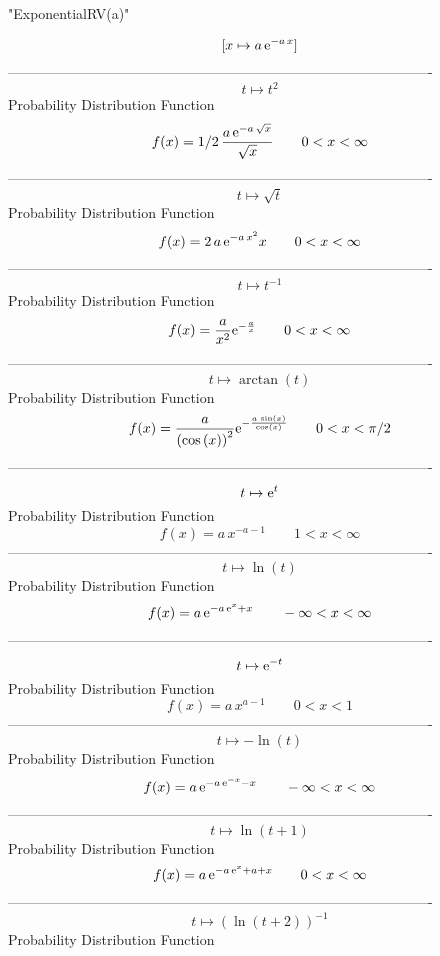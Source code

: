 \documentclass[12pt]{article}
\begin{document}
 
                             "ExponentialRV(a)"

$$[x\mapsto a\,{{\rm e}^{-a\,x}}]
$$-------------------------------------------------------------------------------------------  \\$$t\mapsto {t}^{2}
$$Probability Distribution Function 
$$  f(x)=1/2\,{\frac {a\,{{\rm e}^{-a\,\sqrt {x}}}}{\sqrt {x}}}
 \qquad0
 < x < \infty 
$$-------------------------------------------------------------------------------------------  \\$$t\mapsto \sqrt {t}
$$Probability Distribution Function 
$$  f(x)=2\,a\,{{\rm e}^{-a\,{x}^{2}}}x
 \qquad0
 < x < \infty 
$$-------------------------------------------------------------------------------------------  \\$$t\mapsto {t}^{-1}
$$Probability Distribution Function 
$$  f(x)={\frac {a}{{x}^{2}}{{\rm e}^{-{\frac {a}{x}}}}}
 \qquad0
 < x < \infty 
$$-------------------------------------------------------------------------------------------  \\$$t\mapsto \arctan \left( t \right) 
$$Probability Distribution Function 
$$  f(x)={\frac {a}{ \left( \cos \left( x \right)  \right) ^{2}}{{\rm e}^{-{
\frac {a\,\sin \left( x \right) }{\cos \left( x \right) }}}}}
 \qquad0
 < x < \pi/2
$$-------------------------------------------------------------------------------------------  \\$$t\mapsto {{\rm e}^{t}}
$$Probability Distribution Function 
$$  f(x)=a\,{x}^{-a-1}
 \qquad1
 < x < \infty 
$$-------------------------------------------------------------------------------------------  \\$$t\mapsto \ln  \left( t \right) 
$$Probability Distribution Function 
$$  f(x)=a\,{{\rm e}^{-a\,{{\rm e}^{x}}+x}}
 \qquad-\infty 
 < x < \infty 
$$-------------------------------------------------------------------------------------------  \\$$t\mapsto {{\rm e}^{-t}}
$$Probability Distribution Function 
$$  f(x)=a\,{x}^{a-1}
 \qquad0
 < x < 1
$$-------------------------------------------------------------------------------------------  \\$$t\mapsto -\ln  \left( t \right) 
$$Probability Distribution Function 
$$  f(x)=a\,{{\rm e}^{-a\,{{\rm e}^{-x}}-x}}
 \qquad-\infty 
 < x < \infty 
$$-------------------------------------------------------------------------------------------  \\$$t\mapsto \ln  \left( t+1 \right) 
$$Probability Distribution Function 
$$  f(x)=a\,{{\rm e}^{-a\,{{\rm e}^{x}}+a+x}}
 \qquad0
 < x < \infty 
$$-------------------------------------------------------------------------------------------  \\$$t\mapsto  \left( \ln  \left( t+2 \right)  \right) ^{-1}
$$Probability Distribution Function 
\end{document}
